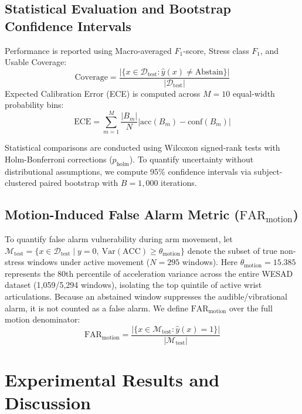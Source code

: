 \documentclass[conference]{IEEEtran}
\begin{document}
\subsection{Statistical Evaluation and Bootstrap Confidence Intervals}
Performance is reported using Macro-averaged $F_1$-score, Stress class $F_1$, and Usable Coverage:
\begin{equation}
\text{Coverage} = \frac{|\{x \in \mathcal{D}_{\text{test}} : \hat{y}(x) \neq \text{Abstain}\}|}{|\mathcal{D}_{\text{test}}|}
\end{equation}
Expected Calibration Error (ECE) is computed across $M=10$ equal-width probability bins:
\begin{equation}
\text{ECE} = \sum_{m=1}^M \frac{|B_m|}{N} \left| \text{acc}(B_m) - \text{conf}(B_m) \right|
\end{equation}

Statistical comparisons are conducted using Wilcoxon signed-rank tests with Holm-Bonferroni corrections ($p_{\text{holm}}$). To quantify uncertainty without distributional assumptions, we compute 95\% confidence intervals via subject-clustered paired bootstrap with $B=1,000$ iterations.

\subsection{Motion-Induced False Alarm Metric ($\text{FAR}_{\text{motion}}$)}
To quantify false alarm vulnerability during arm movement, let $\mathcal{M}_{\text{test}} = \{x \in \mathcal{D}_{\text{test}} \mid y=0, \ \text{Var}(\text{ACC}) \ge \theta_{\text{motion}}\}$ denote the subset of true non-stress windows under active movement ($N=295$ windows). Here $\theta_{\text{motion}} = 15.385$ represents the 80th percentile of acceleration variance across the entire WESAD dataset (1,059/5,294 windows), isolating the top quintile of active wrist articulations. Because an abstained window suppresses the audible/vibrational alarm, it is not counted as a false alarm. We define $\text{FAR}_{\text{motion}}$ over the full motion denominator:
\begin{equation}
\text{FAR}_{\text{motion}} = \frac{|\{x \in \mathcal{M}_{\text{test}} : \hat{y}(x) = 1\}|}{|\mathcal{M}_{\text{test}}|}
\end{equation}

\section{Experimental Results and Discussion}
\end{document}
